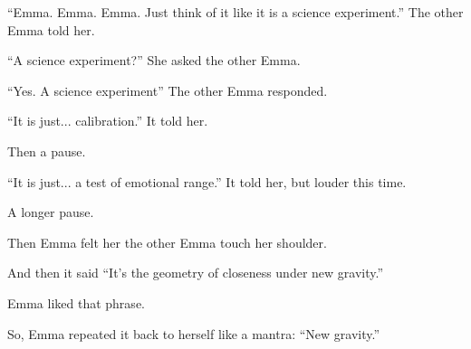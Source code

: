 ``Emma. Emma. Emma. Just think of it like it is a science experiment.'' The other Emma told her.

``A science experiment?'' She asked the other Emma.

``Yes. A science experiment'' The other Emma responded.

``It is just... calibration.'' It told her.

Then a pause.

``It is just... a test of emotional range.'' It told her, but louder this time.

A longer pause.

Then Emma felt her the other Emma touch her shoulder. 

And then it said
``It's the geometry of closeness under new gravity.''

Emma liked that phrase. 

So, Emma repeated it back to herself like a mantra: ``New gravity.''

\medskip

